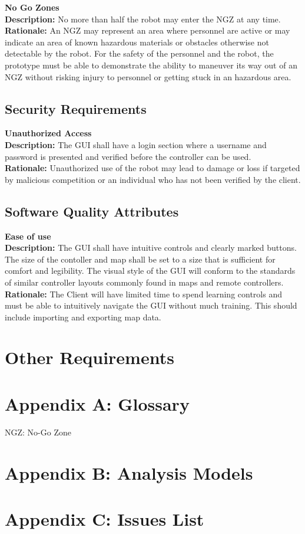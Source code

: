 \documentclass[10pt,a4paper,titlepage]{article}
\begin{document}
		\textbf{No Go Zones}\\
		\textbf {Description:} No more than half the robot may enter the NGZ at any time.\\
		\textbf{Rationale:} An NGZ may represent an area where personnel are active or may indicate an area of known hazardous materials or obstacles otherwise not detectable by the robot. For the safety of the personnel and the robot, the prototype must be able to demonstrate the ability to maneuver its way out of an NGZ without risking injury to personnel or getting stuck in an hazardous area.\\
	\subsection{Security Requirements}
		\textbf {Unauthorized Access}\\

		\textbf {Description:} The GUI shall have a login section where a username and password is presented and verified before the controller can be used.\\
		\textbf{Rationale:} Unauthorized use of the robot may lead to damage or loss if targeted by malicious competition or an individual who has not been verified by the client.\\
 
	\subsection{Software Quality Attributes}
		
		\textbf {Ease of use}\\
		\textbf {Description:} The GUI shall have intuitive controls and clearly marked buttons. The size of the contoller and map shall be set to a size that is sufficient for comfort and legibility. The visual style of the GUI will conform to the standards of similar controller layouts commonly found in maps and remote controllers.\\
		\textbf {Rationale:} The Client will have limited time to spend learning controls and must be able to intuitively navigate the GUI without much training. This should include importing and exporting map data.\\

	\section{Other Requirements}

	\section{Appendix A: Glossary}
		NGZ: No-Go Zone

	\section{Appendix B: Analysis Models}

	\section{Appendix C: Issues List}
\end{document}
